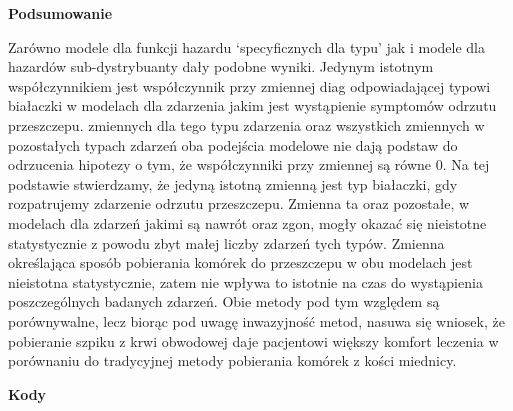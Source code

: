 \documentclass[]{article}
\begin{document}
\vspace{10pt}

\textbf{Podsumowanie}

Zarówno modele dla funkcji hazardu `specyficznych dla typu' jak i modele
dla hazardów sub-dystrybuanty dały podobne wyniki. Jedynym istotnym
współczynnikiem jest współczynnik przy zmiennej \textsf{diag}
odpowiadającej typowi białaczki w modelach dla zdarzenia jakim jest
wystąpienie symptomów odrzutu przeszczepu. 
zmiennych dla tego typu zdarzenia oraz wszystkich zmiennych w
pozostałych typach zdarzeń oba podejścia modelowe nie dają podstaw do
odrzucenia hipotezy o tym, że współczynniki przy zmiennej są równe 0. Na
tej podstawie stwierdzamy, że jedyną istotną zmienną jest typ białaczki,
gdy rozpatrujemy zdarzenie odrzutu przeszczepu. Zmienna ta oraz
pozostałe, w modelach dla zdarzeń jakimi są nawrót oraz zgon, mogły
okazać się nieistotne statystycznie z powodu zbyt małej liczby zdarzeń
tych typów. Zmienna określająca sposób pobierania komórek do przeszczepu
w obu modelach jest nieistotna statystycznie, zatem nie wpływa to
istotnie na czas do wystąpienia poszczególnych badanych zdarzeń. Obie
metody pod tym względem są porównywalne, lecz biorąc pod uwagę
inwazyjność metod, nasuwa się wniosek, że pobieranie szpiku z krwi
obwodowej daje pacjentowi większy komfort leczenia w porównaniu do
tradycyjnej metody pobierania komórek z kości miednicy.

\newpage
\small
\textbf{Kody}
\end{document}

